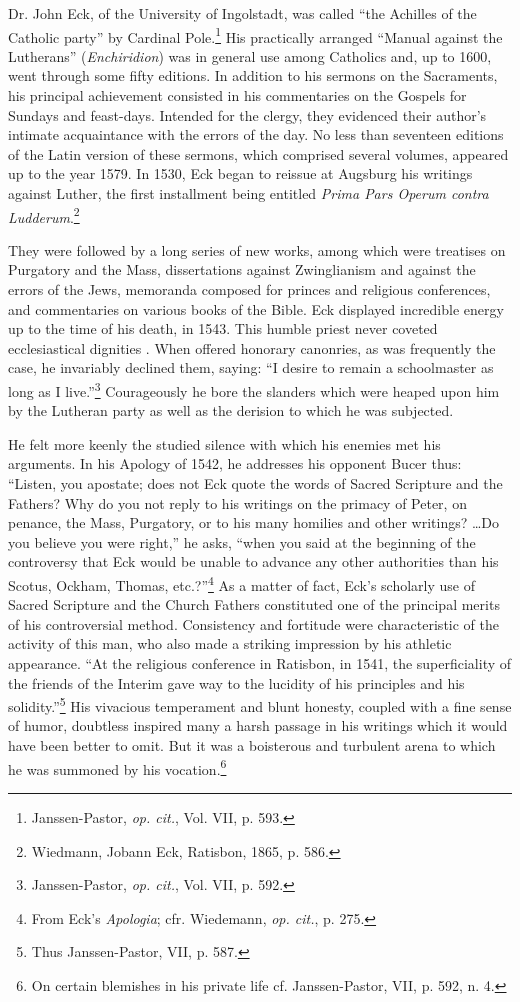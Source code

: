 Dr. John Eck, of the University of Ingolstadt, was called “the
Achilles of the Catholic party” by Cardinal Pole.\footnote{Janssen-Pastor, \textit{op. cit.}, Vol. VII, p. 593.}
 His practically arranged
“Manual against the Lutherans” (\textit{Enchiridion}) was in general
use among Catholics and, up to 1600, went through some fifty editions.
In addition to his sermons on the Sacraments, his principal
achievement consisted in his commentaries on the Gospels for Sundays
and feast-days. Intended for the clergy, they evidenced their author’s
intimate acquaintance with the errors of the day. No less than
seventeen editions of the Latin version of these sermons, which comprised
several volumes, appeared up to the year 1579. In 1530, Eck
began to reissue at Augsburg his writings against Luther, the first
installment being entitled \textit{Prima Pars Operum contra Ludderum}.\footnote{Wiedmann, Jobann Eck, Ratisbon, 1865, p. 586.}

They were followed by a long series of new works, among which were
treatises on Purgatory and the Mass, dissertations against Zwinglianism
and against the errors of the Jews, memoranda composed for
princes and religious conferences, and commentaries on various books
of the Bible. Eck displayed incredible energy up to the time of his
death, in 1543. This humble priest never coveted ecclesiastical dignities
. When offered honorary canonries, as was frequently the case, he
invariably declined them, saying: “I desire to remain a schoolmaster
as long as I live.”\footnote{Janssen-Pastor, \textit{op. cit.}, Vol. VII, p. 592.}
 Courageously he bore the slanders which were
heaped upon him by the Lutheran party as well as the derision to
which he was subjected.

He felt more keenly the studied silence with which his enemies met
his arguments. In his Apology of 1542, he addresses his opponent
Bucer thus: “Listen, you apostate; does not Eck quote the words of
Sacred Scripture and the Fathers? Why do you not reply to his writings
on the primacy of Peter, on penance, the Mass, Purgatory, or to
his many homilies and other writings? \dots Do you believe you were
right,” he asks, “when you said at the beginning of the controversy
that Eck would be unable to advance any other authorities than his
Scotus, Ockham, Thomas, etc.?”\footnote{From Eck’s \textit{Apologia}; cfr. Wiedemann, \textit{op. cit.}, p. 275.}
 As a matter of fact, Eck’s
scholarly use of Sacred Scripture and the Church Fathers constituted
one of the principal merits of his controversial method. Consistency
and fortitude were characteristic of the activity of this man, who
also made a striking impression by his athletic appearance. “At the
religious conference in Ratisbon, in 1541, the superficiality of the
friends of the Interim gave way to the lucidity of his principles and
his solidity.”\footnote{Thus Janssen-Pastor, VII, p. 587.}
 His vivacious temperament and blunt honesty, coupled
with a fine sense of humor, doubtless inspired many a harsh passage in
his writings which it would have been better to omit. But it was a
boisterous and turbulent arena to which he was summoned by his
vocation.\footnote{On certain blemishes in his private life cf. Janssen-Pastor, VII, p. 592, n. 4.}



